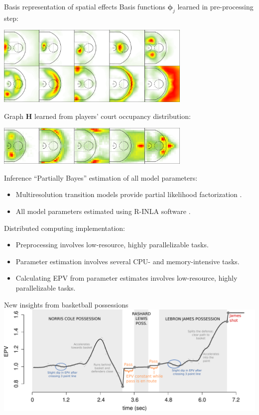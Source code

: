 \documentclass[10pt]{beamer}
\begin{document}
\begin{frame}{Basis representation of spatial effects}
Basis functions $\boldsymbol{\phi}_j$ learned in pre-processing step:
\begin{center}
\includegraphics[width=0.7\textwidth]{graphics/bplots_3}
\end{center}
\pause
Graph $\mathbf{H}$ learned from players' court occupancy distribution:
\begin{center}
\includegraphics[width=0.7\textwidth]{graphics/H_bases}
\end{center}
\end{frame}

\begin{frame}{Inference}
``Partially Bayes'' estimation of all model parameters:
\pause
\begin{itemize}
\item Multiresolution transition models provide partial likelihood factorization \cite{cox1975note}.
\item All model parameters estimated using R-INLA software \cite{rue2009approximate, lindgren2011explicit}.
\end{itemize}
\pause
Distributed computing implementation:
\begin{itemize}
\item Preprocessing involves low-resource, highly parallelizable tasks.
\item Parameter estimation involves several CPU- and memory-intensive tasks.
\item Calculating EPV from parameter estimates involves low-resource, highly parallelizable tasks.
\end{itemize}
\end{frame}

\begin{frame}{New insights from basketball possessions}
\includegraphics[width=1.0\textwidth]{graphics/ticker_1_edit}
\end{frame}
\end{document}
